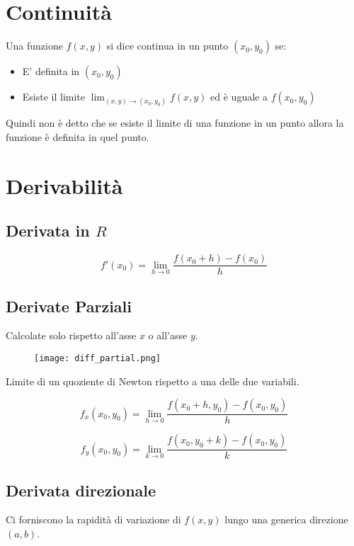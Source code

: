 \section{Continuità}

Una funzione $f(x,y)$ si dice continua in un punto $(x_0,y_0)$ se:

\begin{itemize}
\item E' definita in $(x_0,y_0)$
\item Esiste il limite $\lim_{(x,y)\to(x_0,y_0)} f(x,y)$ ed è uguale a $f(x_0,y_0)$
\end{itemize}

Quindi non è detto che se esiste il limite di una funzione in un punto allora la funzione è definita in quel punto.

\section{Derivabilità}

\subsection{Derivata in $R$}

$$f'(x_0)=\lim_{h\to 0}\frac{f(x_0+h)-f(x_0)}{h}$$

\subsection{Derivate Parziali}

Calcolate solo rispetto all'asse $x$ o all'asse $y$.

\begin{figure}[H]
\texttt{[image: diff\_partial.png]}
\end{figure}

Limite di un quoziente di Newton rispetto a una delle due variabili.

$$
f_x(x_0,y_0) = \lim_{h\to 0} \frac{f(x_0+h,y_0)-f(x_0,y_0)}{h}
$$

$$
f_y(x_0,y_0) = \lim_{k\to 0} \frac{f(x_0,y_0+k)-f(x_0,y_0)}{k}
$$

\subsection{Derivata direzionale}

Ci forniscono la rapidità di variazione di $f(x,y)$ lungo una generica direzione $(a,b)$.

